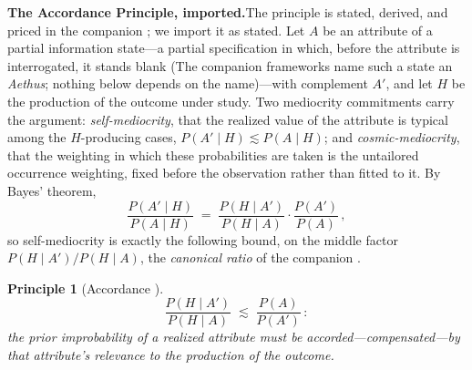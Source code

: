 \documentclass{article}
\newtheorem{principle}{Principle}
\begin{document}
\par\medskip\noindent\textbf{The Accordance Principle, imported.}\enspace The principle is stated, derived, and priced in the companion \cite{NexicFoundation}; we import it as stated. Let $A$ be an attribute of a partial information state---a partial specification in which, before the attribute is interrogated, it stands blank (The companion frameworks name such a state an \emph{Aethus}; nothing below depends on the name)---with complement $A'$, and let $H$ be the production of the outcome under study. Two mediocrity commitments carry the argument: \emph{self-mediocrity}, that the realized value of the attribute is typical among the $H$-producing cases, $P(A'\mid H) \lesssim P(A \mid H)$; and \emph{cosmic-mediocrity}, that the weighting in which these probabilities are taken is the untailored occurrence weighting, fixed before the observation rather than fitted to it. By Bayes' theorem,
\begin{equation}\label{eq:app-bayes}
  \frac{P(A'\mid H)}{P(A\mid H)} \;=\; \frac{P(H\mid A')}{P(H\mid A)} \cdot \frac{P(A')}{P(A)}\,,
\end{equation}
so self-mediocrity is exactly the following bound, on the middle factor $P(H \mid A')/P(H \mid A)$, the \emph{canonical ratio} of the companion \cite{NexicFoundation}.

\begin{principle}[Accordance \cite{NexicFoundation}]\label{app:prin-accordance}
\[
  \frac{P(H \mid A')}{P(H \mid A)} \;\lesssim\; \frac{P(A)}{P(A')}\,:
\]
the prior improbability of a realized attribute must be accorded---compensated---by that attribute's relevance to the production of the outcome.
\end{principle}
\end{document}
